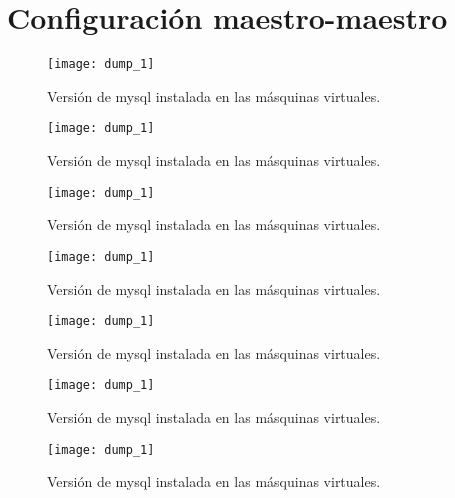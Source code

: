 \chapter{Configuración maestro-maestro}

\begin{figure}[h!]
\begin{center}
\caption{Versión de mysql instalada en las másquinas virtuales.}
\label{dump_1}
\texttt{[image: dump\_1]}
\end{center}
\end{figure}

\begin{figure}[h!]
\begin{center}
\caption{Versión de mysql instalada en las másquinas virtuales.}
\label{dump_1}
\texttt{[image: dump\_1]}
\end{center}
\end{figure}

\begin{figure}[h!]
\begin{center}
\caption{Versión de mysql instalada en las másquinas virtuales.}
\label{dump_1}
\texttt{[image: dump\_1]}
\end{center}
\end{figure}

\begin{figure}[h!]
\begin{center}
\caption{Versión de mysql instalada en las másquinas virtuales.}
\label{dump_1}
\texttt{[image: dump\_1]}
\end{center}
\end{figure}

\begin{figure}[h!]
\begin{center}
\caption{Versión de mysql instalada en las másquinas virtuales.}
\label{dump_1}
\texttt{[image: dump\_1]}
\end{center}
\end{figure}

\begin{figure}[h!]
\begin{center}
\caption{Versión de mysql instalada en las másquinas virtuales.}
\label{dump_1}
\texttt{[image: dump\_1]}
\end{center}
\end{figure}

\begin{figure}[h!]
\begin{center}
\caption{Versión de mysql instalada en las másquinas virtuales.}
\label{dump_1}
\texttt{[image: dump\_1]}
\end{center}
\end{figure}


